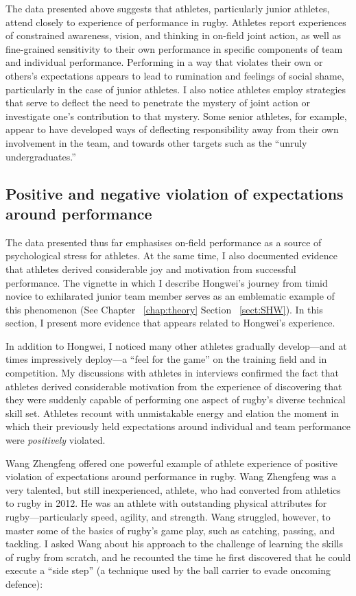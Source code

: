 \begin{CJK}{UTF8}{gbsn}
The data presented above suggests that athletes, particularly junior athletes, attend closely to experience of performance in rugby.  Athletes report experiences of constrained awareness, vision, and thinking in on-field joint action, as well as fine-grained sensitivity
to their own performance in specific components of team and individual performance.  Performing in a way that violates their own or others's expectations appears to lead to rumination and feelings of social shame, particularly in the case of junior athletes. I also notice athletes employ strategies that serve to deflect the need to penetrate the mystery of joint action or investigate one's contribution to that mystery.  Some senior athletes, for example, appear to have developed ways of deflecting responsibility away from their own involvement in the team, and towards other targets such as the ``unruly undergraduates.''


\subsection{Positive and negative violation of expectations around performance\label{sect:expectationViolation}}

The data presented thus far emphasises on-field performance as a source of psychological stress for athletes. At the same time, I also documented evidence that athletes derived considerable joy and motivation from successful performance.  The vignette in which I describe Hongwei's journey from timid novice to exhilarated junior team member serves as an emblematic example of this phenomenon (See Chapter ~\ref{chap:theory} Section ~\ref{sect:SHW}).  In this section, I present more evidence that appears related to Hongwei's experience.

In addition to Hongwei, I noticed many other athletes gradually develop---and at times impressively deploy---a ``feel for the game'' on the training field and in competition.  My discussions with athletes in interviews confirmed the fact that athletes derived considerable motivation from the experience of discovering that they were suddenly capable of performing one aspect of rugby's diverse technical skill set.  Athletes recount with unmistakable energy and elation the moment in which their previously held expectations around individual and team performance were \textit{positively} violated.

Wang Zhengfeng offered one powerful example of athlete experience of positive violation of expectations around performance in rugby.  Wang Zhengfeng was a very talented, but still inexperienced, athlete, who had converted from athletics to rugby in 2012.  He was an athlete with outstanding physical attributes for rugby---particularly speed, agility, and strength.  Wang struggled, however, to master some of the basics of rugby's game play, such as catching, passing, and tackling. I asked Wang about his approach to the challenge of learning the skills of rugby from scratch, and he recounted the time he first discovered that he could execute a ``side step'' (a technique used by the ball carrier to evade oncoming defence):


\end{CJK}
